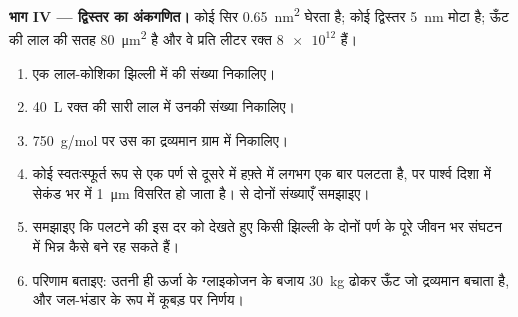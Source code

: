\begin{problem}
\medskip
\noindent\textbf{भाग IV --- द्विस्तर का अंकगणित।}
कोई  सिर \qty{0.65}{nm^2} घेरता है; कोई द्विस्तर
\qty{5}{nm} मोटा है; ऊँट की लाल  की सतह
\qty{80}{\micro m^2} है और वे प्रति लीटर रक्त $\num{8e12}$ हैं।
\begin{enumerate}[resume]
  \item एक लाल-कोशिका झिल्ली में  की संख्या निकालिए।
  \item \qty{40}{L} रक्त की सारी लाल  में उनकी संख्या निकालिए।
  \item \qty{750}{g/mol} पर उस  का द्रव्यमान ग्राम में निकालिए।
  \item कोई  स्वतःस्फूर्त रूप से एक पर्ण से दूसरे में
        हफ़्ते में लगभग एक बार पलटता है, पर पार्श्व दिशा में सेकंड भर
        में \qty{1}{\micro m} विसरित हो जाता है।  से
        दोनों संख्याएँ समझाइए।
  \item समझाइए कि पलटने की इस दर को देखते हुए किसी झिल्ली के दोनों पर्ण
         के पूरे जीवन भर संघटन में भिन्न कैसे बने रह सकते हैं।
  \item परिणाम बताइए: उतनी ही ऊर्जा के ग्लाइकोजन के बजाय \qty{30}{kg}
         ढोकर ऊँट जो द्रव्यमान बचाता है, और जल-भंडार के रूप में
        कूबड़ पर निर्णय।
\end{enumerate}
\end{problem}
